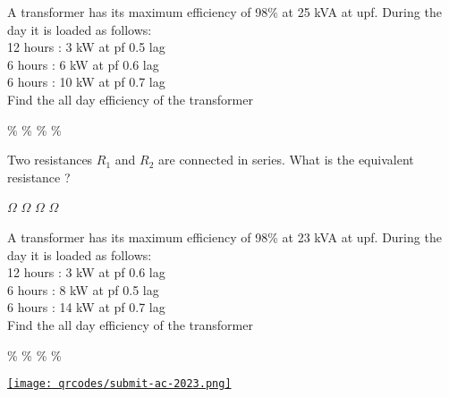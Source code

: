 \documentclass{exam}
\begin{document}
\begin{multicols}{2}
\begin{questions}
\question A transformer has its maximum efficiency of 98\% at 25 kVA at upf. During the day it is loaded as follows:\\
12 hours : 3 kW at pf 0.5 lag\\
6 hours : 6 kW at pf 0.6 lag\\
6 hours : 10 kW at pf 0.7 lag\\
Find the all day efficiency of the transformer
\begin{randomizechoices}
 \%
 \%
 \%
 \%
\end{randomizechoices}

\question Two resistances $R_1$ and $R_2$ are connected in series. What is the equivalent resistance ?

\begin{choices}
  $\Omega$
   $\Omega$
    $\Omega$
 $\Omega$  
\end{choices}

\question A transformer has its maximum efficiency of 98\% at 23 kVA at upf. During the day it is loaded as follows:\\
12 hours : 3 kW at pf 0.6 lag\\
6 hours : 8 kW at pf 0.5 lag\\
6 hours : 14 kW at pf 0.7 lag\\
Find the all day efficiency of the transformer
\begin{randomizechoices}
 \%
 \%
 \%
 \%
\end{randomizechoices}


\end{questions}
\end{multicols}
\vspace{1cm}

\href{https://forms.gle/GEV9a8bPWrhH6ETT6}
{\texttt{[image: qrcodes/submit-ac-2023.png]}}


\end{document}
